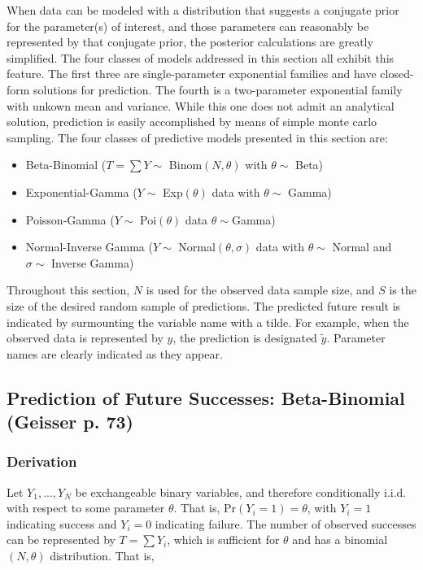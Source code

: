 \documentclass[12pt, a4paper]{article}
\begin{document}
\noindent When data can be modeled with a distribution that suggests a conjugate prior for the parameter(s) of interest, and those parameters can reasonably be represented by that conjugate prior, the posterior calculations are greatly simplified.  The four classes of models addressed in this section all exhibit this feature.  The first three are single-parameter exponential families and have closed-form solutions for prediction.  The fourth is a two-parameter exponential family with unkown mean and variance.  While this one does not admit an analytical solution, prediction is easily accomplished by means of simple monte carlo sampling.  The four classes of predictive models presented in this section are:
\begin{itemize}
  \item Beta-Binomial ($T = \sum Y\sim$ Binom$(N,\theta)$ with $\theta\sim$ Beta)
  \item Exponential-Gamma ($Y\sim$ Exp$(\theta)$ data with $\theta\sim$ Gamma)
  \item Poisson-Gamma ($Y\sim$ Poi$(\theta)$ data $\theta\sim$Gamma)
  \item Normal-Inverse Gamma ($Y\sim$ Normal$(\theta,\sigma)$ data with $\theta\sim$ Normal and $\sigma\sim$ Inverse Gamma)
\end{itemize}

\noindent Throughout this section, $N$ is used for the observed data sample
size, and $S$ is the size of the desired random sample of predictions. The predicted future result
is indicated by surmounting the variable name with a tilde.  For example, when the observed data is represented by $y$, the prediction is designated $\tilde{y}$. Parameter names are clearly indicated as they appear.

  \subsection{Prediction of Future Successes:  Beta-Binomial (Geisser p. 73)}


    \subsubsection{Derivation}

    \noindent Let $Y_1,...,Y_N$ be exchangeable binary variables, and therefore conditionally i.i.d.  with respect to some parameter $\theta$. That is, Pr$(Y_i = 1) = \theta$, with $Y_i = 1$ indicating success and $Y_i = 0$ indicating failure.  The number of observed successes can be represented by $T = \sum Y_i$, which is sufficient for $\theta$ and has a binomial$(N,\theta)$ distribution.  That is,
\end{document}
